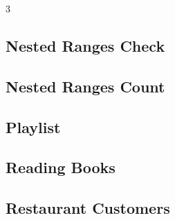 \documentclass[8pt]{extarticle}
\begin{document}
\begin{multicols*}{3}
\subsection{Nested Ranges Check}
\begin{caixaenunciado}

\end{caixaenunciado}
\vspace{0.3cm}


\subsection{Nested Ranges Count}
\begin{caixaenunciado}

\end{caixaenunciado}
\vspace{0.3cm}


\subsection{Playlist}
\begin{caixaenunciado}

\end{caixaenunciado}
\vspace{0.3cm}


\subsection{Reading Books}
\begin{caixaenunciado}

\end{caixaenunciado}
\vspace{0.3cm}


\subsection{Restaurant Customers}
\begin{caixaenunciado}

\end{caixaenunciado}
\vspace{0.3cm}



\end{multicols*}
\end{document}
